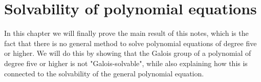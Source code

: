 \section{Solvability of polynomial equations}
In this chapter we will finally prove the main result of this notes, which is 
the fact that there is no general method to solve polynomial equations of degree
five or higher. We will do this by showing that the Galois group of a
polynomial of degree five or higher is not "Galois-solvable", while also explaining 
how this is connected to the solvability of the general polynomial equation. \\


